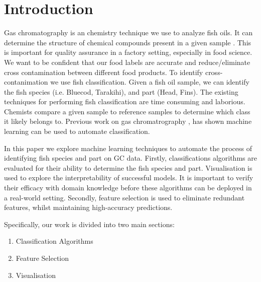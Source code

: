 \documentclass[runningheads]{llncs}
\begin{document}
\section{Introduction}


Gas chromatography \cite{eder1995gas} is an chemistry technique we use to analyze fish oils. 
It can determine the structure of chemical compounds present in a given sample \cite{restek2018high}. 
This is important for quality assurance in a factory setting, especially in food science. 
We want to be confident that our food labels are accurate and reduce/eliminate cross contamination between different food products. 
To identify cross-contanimation we use fish classification. 
Given a fish oil sample, we can identify the fish species (i.e. Bluecod, Tarakihi), and part (Head, Fins).
The existing techniques for performing fish classification are time consuming and laborious. 
Chemists compare a given sample to reference samples to determine which class it likely belongs to. 
Previous work on gas chromatrography \cite{bi2020gc,matyushin2020gas}, has shown machine learning can be used to automate classification. 

In this paper we explore machine learning techniques to automate the process of identifying fish species and part on GC data. 
Firstly, classifications algorithms are evaluated for their ability to determine the fish species and part. 
Visualisation is used to explore the interpretability of successful models.
It is important to verify their efficacy with domain knowledge before these algorithms can be deployed in a real-world setting.
Secondly, feature selection is used to eliminate redundant features, whilst maintaining high-accuracy predictions. 

Specifically, our work is divided into two main sections: 
\begin{enumerate}
  \item Classification Algorithms
  \item Feature Selection
  \item Visualisation
\end{enumerate}
\end{document}
